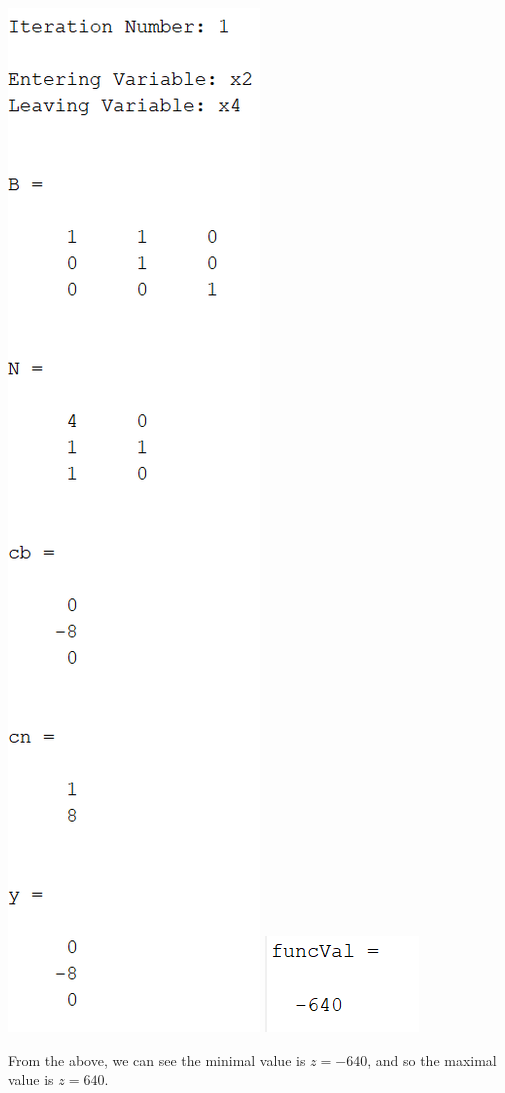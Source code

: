 \documentclass{article}
\begin{document}
\begin{itemize}
\begin{center}
        \includegraphics[scale = 0.7]{2_2_v_iter1}
        \newline
        \includegraphics[scale = 1]{2_2_v_min}
    \end{center}
    From the above, we can see the minimal value is $z = -640$, and so the maximal value is $z = 640$.
\end{itemize}
\end{document}
